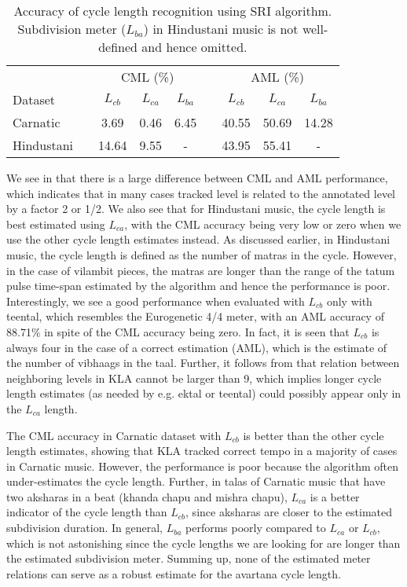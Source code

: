 \begin{table}
\centering
\begin{tabular}{@{}lcccccccc@{}} \toprule
 & & \multicolumn{3}{c}{\acrshort{CML} (\%)} & & \multicolumn{3}{c}{\acrshort{AML} (\%)}\tabularnewline
Dataset & & $L_{cb}$ & $L_{ca}$ & $L_{ba}$ & & $L_{cb}$ & $L_{ca}$ & $L_{ba}$ \tabularnewline \midrule
Carnatic & & 3.69 & 0.46 & 6.45 & & 40.55 & 50.69 & 14.28 \tabularnewline \addlinespace[3pt]
Hindustani & & 14.64 & 9.55 & - & & 43.95 & 55.41 & - \tabularnewline \bottomrule
\end{tabular}
\caption[Accuracy of cycle length recognition using \acrshort{SRI} algorithm]{Accuracy of cycle length recognition using \acrshort{SRI} algorithm. Subdivision meter ($L_{ba}$) in Hindustani music is not well-defined and hence omitted.}
\label{tab:jnmreval:cycleSRI}
\end{table}

We see in  that there is a large difference between \gls{CML} and \gls{AML} performance, which indicates that in many cases tracked level is related to the annotated level by a factor 2 or 1/2. We also see that for Hindustani music, the cycle length is best estimated using $L_{ca}$, with the \gls{CML} accuracy being very low or zero when we use the other cycle length estimates instead. As discussed earlier, in Hindustani music, the cycle length is defined as the number of \glspl{matra} in the cycle. However, in the case of \gls{vilambit} pieces, the \glspl{matra} are longer than the range of the tatum pulse time-span estimated by the algorithm and hence the performance is poor. Interestingly, we see a good performance when evaluated with $L_{cb}$ only with \gls{teental}, which resembles the Eurogenetic 4/4 meter, with an \gls{AML} accuracy of 88.71\% in spite of the \gls{CML} accuracy being zero. In fact, it is seen that $L_{cb}$ is always four in the case of a correct estimation (\gls{AML}), which is the estimate of the number of \glspl{vibhaag} in the \gls{taal}. Further, it follows from  that relation between neighboring levels in \acrshort{KLA} cannot be larger than 9, which implies longer cycle length estimates (as needed by e.g. \gls{ektal} or \gls{teental}) could possibly appear only in the $L_{ca}$ length. 

The \gls{CML} accuracy in Carnatic dataset with $L_{cb}$ is better than the other cycle length estimates, showing that \acrshort{KLA} tracked correct tempo in a majority of cases in Carnatic music. However, the performance is poor because the algorithm often under-estimates the cycle length. Further, in \glspl{tala} of Carnatic music that have two \glspl{akshara} in a beat (\gls{khanda chapu} and \gls{mishra chapu}), $L_{ca}$ is a better indicator of the cycle length than $L_{cb}$, since \glspl{akshara} are closer to the estimated subdivision duration. In general, $L_{ba}$ performs poorly compared to $L_{ca}$ or $L_{cb}$, which is not astonishing since the cycle lengths we are looking for are longer than the estimated subdivision meter. Summing up, none of the estimated meter relations can serve as a robust estimate for the \gls{avartana} cycle length. 

